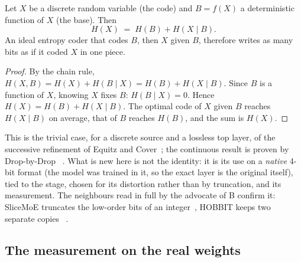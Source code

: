 \begin{proposition}\label{prop:raffinement}
Let $X$ be a discrete random variable (the code) and $B = f(X)$ a deterministic function of $X$ (the base). Then
\begin{equation}\label{eq:raffinement}
H(X) \;=\; H(B) + H(X \mid B).
\end{equation}
An ideal entropy coder that codes $B$, then $X$ given $B$, therefore writes as many bits as if it coded $X$ in one piece.
\end{proposition}

\begin{proof}
By the chain rule, $H(X, B) = H(X) + H(B \mid X) = H(B) + H(X \mid B)$. Since $B$ is a function of $X$, knowing $X$ fixes $B$: $H(B \mid X) = 0$. Hence $H(X) = H(B) + H(X \mid B)$. The optimal code of $X$ given $B$ reaches $H(X \mid B)$ on average, that of $B$ reaches $H(B)$, and the sum is $H(X)$.
\end{proof}

This is the trivial case, for a discrete source and a lossless top layer, of the successive refinement of Equitz and Cover~\cite{equitz1991successive}; the continuous result is proven by Drop-by-Drop~\cite{babaoglu2026dropbydrop} \litt. What is new here is not the identity: it is its use on a \emph{native} 4-bit format (the model was trained in it, so the exact layer is the original itself), tied to the stage, chosen for its distortion rather than by truncation, and its measurement. The neighbours read in full by the advocate of B confirm it: SliceMoE truncates the low-order bits of an integer~\cite{choi2025slicemoecorps}, HOBBIT keeps two separate copies~\cite{tang2024hobbit} \litt.

\subsection{The measurement on the real weights}

